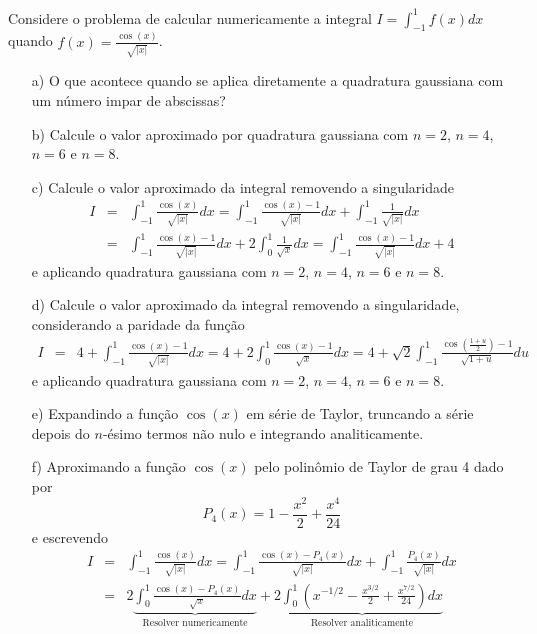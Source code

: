 \begin{exer} Considere o problema de calcular numericamente a integral $I=\int_{-1}^1f(x)dx$ quando $f(x)=\frac{\cos(x)}{\sqrt{|x|}}$.
\begin{itemize}
\item[a)] O que acontece quando se aplica diretamente a quadratura gaussiana com um número impar de abscissas?
\item[b)] Calcule o valor aproximado por quadratura gaussiana com $n=2$, $n=4$, $n=6$ e $n=8$.
\item[c)] Calcule o valor aproximado da integral removendo a singularidade
\begin{eqnarray*}
I&=&\int_{-1}^1\frac{\cos(x)}{\sqrt{|x|}}dx=\int_{-1}^1\frac{\cos(x)-1}{\sqrt{|x|}}dx+\int_{-1}^1\frac{1}{\sqrt{|x|}}dx \\
&=&\int_{-1}^1\frac{\cos(x)-1}{\sqrt{|x|}}dx+2\int_{0}^1\frac{1}{\sqrt{x}}dx=\int_{-1}^1\frac{\cos(x)-1}{\sqrt{|x|}}dx+4
\end{eqnarray*}
e aplicando quadratura gaussiana com $n=2$, $n=4$, $n=6$ e $n=8$.
\item[d)] Calcule o valor aproximado da integral removendo a singularidade, considerando a paridade da função
\begin{eqnarray*}
I&=&4+\int_{-1}^1\frac{\cos(x)-1}{\sqrt{|x|}}dx=4+2\int_{0}^1\frac{\cos(x)-1}{\sqrt{x}}dx=4+\sqrt{2}\int_{-1}^1\frac{\cos\left(\frac{1+u}{2}\right)-1}{\sqrt{1+u}}du
\end{eqnarray*}
e aplicando quadratura gaussiana com $n=2$, $n=4$, $n=6$ e $n=8$.
\item[e)] Expandindo a função $\cos(x)$ em série de Taylor, truncando a série depois  do $n$-ésimo  termos não nulo e integrando analiticamente. \\
\item[f)] Aproximando a função $\cos(x)$ pelo polinômio de Taylor  de grau 4 dado por $$P_4(x)=1-\frac{x^2}{2}+\frac{x^4}{24}$$
e escrevendo
\begin{eqnarray*}I&=&\int_{-1}^1\frac{\cos(x)}{\sqrt{|x|}}dx=\int_{-1}^1\frac{\cos(x)-P_4(x)}{\sqrt{|x|}}dx+\int_{-1}^1\frac{P_4(x)}{\sqrt{|x|}}dx\\
&=&2\underbrace{\int_{0}^1\frac{\cos(x)-P_4(x)}{\sqrt{x}}dx}_{\text{Resolver numericamente}}+2\underbrace{\int_{0}^1\left(x^{-1/2}-\frac{x^{3/2}}{2}+\frac{x^{7/2}}{24}\right)dx}_{\text{Resolver analiticamente}}
\end{eqnarray*}
\end{itemize}
\end{exer}
